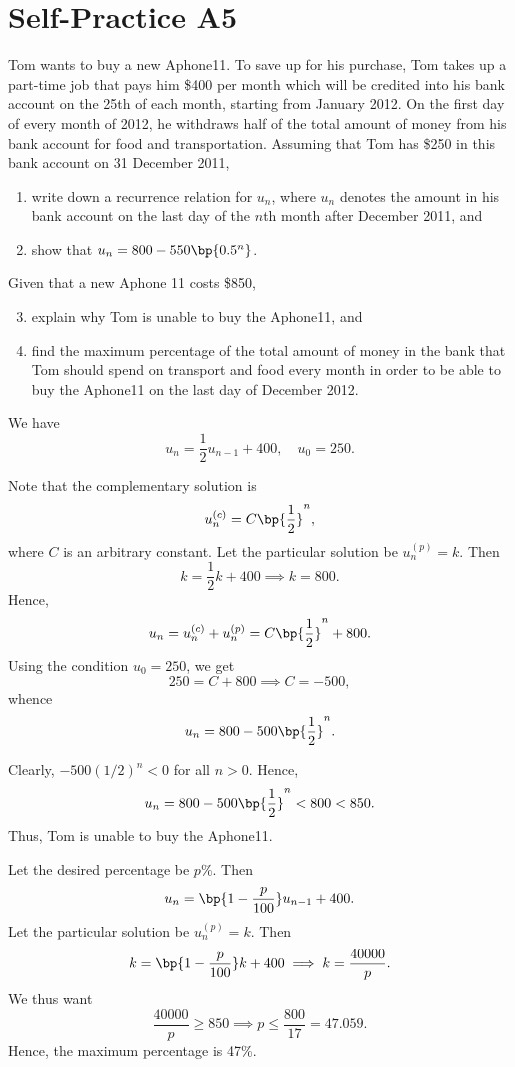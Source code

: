 \section{Self-Practice A5}

\begin{problem}
    Tom wants to buy a new Aphone11. To save up for his purchase, Tom takes up a part-time job that pays him \$400 per month which will be credited into his bank account on the 25th of each month, starting from January 2012. On the first day of every month of 2012, he withdraws half of the total amount of money from his bank account for food and transportation. Assuming that Tom has \$250 in this bank account on 31 December 2011,
    \begin{enumerate}
        \item write down a recurrence relation for $u_n$, where $u_n$ denotes the amount in his bank account on the last day of the $n$th month after December 2011, and
        \item show that $u_n = 800 - 550\bp{0.5^n}$.
    \end{enumerate}
    Given that a new Aphone 11 costs \$850,
    \begin{enumerate}
        \setcounter{enumi}{2}
        \item explain why Tom is unable to buy the Aphone11, and
        \item find the maximum percentage of the total amount of money in the bank that Tom should spend on transport and food every month in order to be able to buy the Aphone11 on the last day of December 2012.
    \end{enumerate}
\end{problem}
\begin{solution}
    \begin{ppart}
        We have \[u_n = \frac12 u_{n-1} + 400, \quad u_0 = 250.\]
    \end{ppart}
    \begin{ppart}
        Note that the complementary solution is \[u_n^{(c)} = C \bp{\frac12}^n,\] where $C$ is an arbitrary constant. Let the particular solution be $u_n^{(p)} = k$. Then \[k = \frac12 k + 400 \implies k = 800.\] Hence, \[u_n = u_n^{(c)} + u_n^{(p)} = C\bp{\frac12}^n + 800.\] Using the condition $u_0 = 250$, we get \[250 = C + 800 \implies C = -500,\] whence \[u_n = 800 - 500\bp{\frac12}^n.\]
    \end{ppart}
    \begin{ppart}
        Clearly, $-500 (1/2)^n < 0$ for all $n > 0$. Hence, \[u_n = 800 - 500\bp{\frac12}^n < 800 < 850.\] Thus, Tom is unable to buy the Aphone11.
    \end{ppart}
    \begin{ppart}
        Let the desired percentage be $p\%$. Then \[u_n = \bp{1 - \frac{p}{100}} u_{n-1} + 400.\] Let the particular solution be $u_n^{(p)} = k$. Then \[k = \bp{1 - \frac{p}{100}} k + 400 \implies k = \frac{40000}{p}.\] We thus want \[\frac{40000}{p} \geq 850 \implies p \leq \frac{800}{17}  = 47.059.\] Hence, the maximum percentage is 47\%.
    \end{ppart}
\end{solution}

